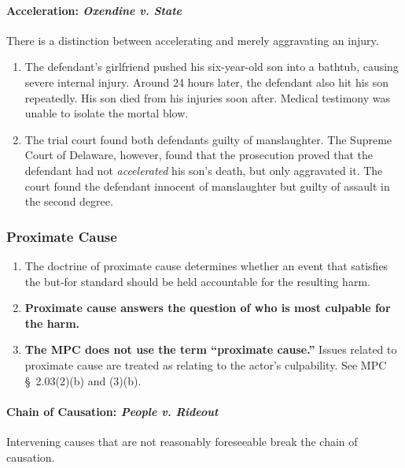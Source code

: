 \paragraph{Acceleration: \emph{Oxendine v. State}}

There is a distinction between accelerating and merely aggravating an injury.

\begin{enumerate}
    \item The defendant's girlfriend pushed his six-year-old son into a 
    bathtub, causing severe internal injury. Around 24 hours later, the 
    defendant also hit his son repeatedly. His son died from his injuries soon 
    after. Medical testimony was unable to isolate the mortal blow.
    \item The trial court found both defendants guilty of manslaughter. The 
    Supreme Court of Delaware, however, found that the prosecution proved that 
    the defendant had not \emph{accelerated} his son's death, but only 
    aggravated it. The court found the defendant innocent of manslaughter but 
    guilty of assault in the second degree.
\end{enumerate}

\subsubsection{Proximate Cause} 

\begin{enumerate}
    \item The doctrine of proximate cause determines whether an event that 
    satisfies the but-for standard should be held accountable for the 
    resulting harm.
    \item \textbf{Proximate cause answers the question of who is most culpable 
    for the harm.}
    \item \textbf{The MPC does not use the term ``proximate cause.''} Issues 
    related to proximate cause are treated as relating to the actor's 
    culpability. See MPC \S\ 2.03(2)(b) and (3)(b).
\end{enumerate}

\paragraph{Chain of Causation: \emph{People v. Rideout}}

Intervening causes that are not reasonably foreseeable break the chain of 
causation.

